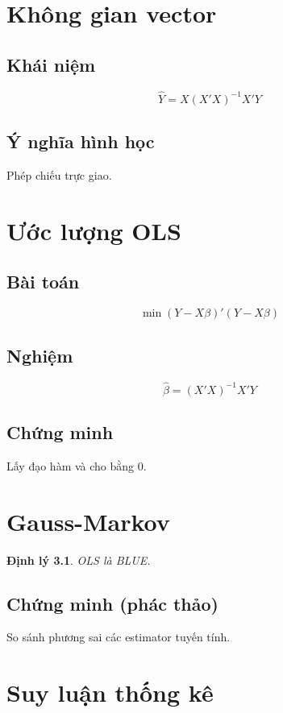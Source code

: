 \documentclass[12pt,a4paper]{book}
\newtheorem{theorem}{Định lý}
\begin{document}
\chapter{Không gian vector}

\section{Khái niệm}
\[
\hat{Y} = X(X'X)^{-1}X'Y
\]

\section{Ý nghĩa hình học}
Phép chiếu trực giao.

\chapter{Ước lượng OLS}

\section{Bài toán}
\[
\min (Y-X\beta)'(Y-X\beta)
\]

\section{Nghiệm}
\[
\hat{\beta} = (X'X)^{-1}X'Y
\]

\section{Chứng minh}
Lấy đạo hàm và cho bằng 0.

\chapter{Gauss-Markov}

\begin{theorem}
OLS là BLUE.
\end{theorem}

\section{Chứng minh (phác thảo)}
So sánh phương sai các estimator tuyến tính.

\chapter{Suy luận thống kê}
\end{document}
